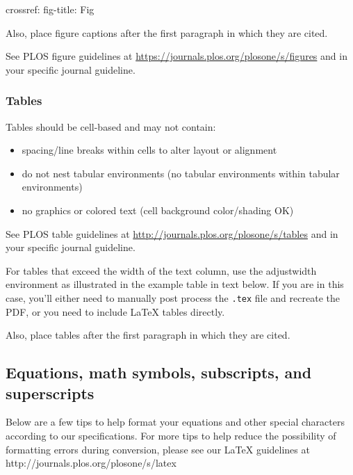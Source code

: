 \documentclass[
  10pt,
  letterpaper,
]{article}
\newenvironment{Shaded}{\begin{snugshade}}{\end{snugshade}}
\newcommand{\AttributeTok}[1]{\textcolor[rgb]{0.40,0.45,0.13}{#1}}
\newcommand{\FunctionTok}[1]{\textcolor[rgb]{0.28,0.35,0.67}{#1}}
\newcommand{\KeywordTok}[1]{\textcolor[rgb]{0.00,0.23,0.31}{#1}}
\providecommand{\tightlist}{%
  \setlength{\itemsep}{0pt}\setlength{\parskip}{0pt}}\usepackage{longtable,booktabs,array}
\begin{document}
\begin{Shaded}
\begin{Highlighting}[]
\FunctionTok{crossref}\KeywordTok{:}
\AttributeTok{  }\FunctionTok{fig{-}title}\KeywordTok{:}\AttributeTok{ Fig }
\end{Highlighting}
\end{Shaded}

Also, place figure captions after the first paragraph in which they are
cited.

See PLOS figure guidelines at
\url{https://journals.plos.org/plosone/s/figures} and in your specific
journal guideline.

\hypertarget{tables}{%
\subsubsection{Tables}\label{tables}}

Tables should be cell-based and may not contain:

\begin{itemize}
\tightlist
\item
  spacing/line breaks within cells to alter layout or alignment
\item
  do not nest tabular environments (no tabular environments within
  tabular environments)
\item
  no graphics or colored text (cell background color/shading OK)
\end{itemize}

See PLOS table guidelines at
\url{http://journals.plos.org/plosone/s/tables} and in your specific
journal guideline.

For tables that exceed the width of the text column, use the adjustwidth
environment as illustrated in the example table in text below. If you
are in this case, you'll either need to manually post process the
\texttt{.tex} file and recreate the PDF, or you need to include LaTeX
tables directly.

Also, place tables after the first paragraph in which they are cited.

\hypertarget{equations-math-symbols-subscripts-and-superscripts}{%
\subsection{Equations, math symbols, subscripts, and
superscripts}\label{equations-math-symbols-subscripts-and-superscripts}}

Below are a few tips to help format your equations and other special
characters according to our specifications. For more tips to help reduce
the possibility of formatting errors during conversion, please see our
LaTeX guidelines at http://journals.plos.org/plosone/s/latex
\end{document}

